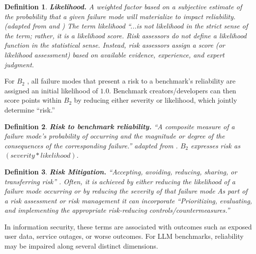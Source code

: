 \documentclass{article}
\newtheorem{dfn}{Definition}[section]
\newcommand\bb{$B_2$ }
\begin{document}
\begin{dfn}
{\bf Likelihood.} A weighted factor based on a subjective estimate of the probability that a given failure mode will materialize to impact reliability. (adapted from \cite{cnssi4009} and \cite{Rausand2004}) The term likelihood ``...is not likelihood in the strict sense of the term; rather, it is a likelihood score. Risk assessors do not define a likelihood function in the statistical sense. Instead, risk assessors assign a score (or likelihood assessment) based on available evidence, experience, and expert judgment. 
\end{dfn}

For \bb, all failure modes that present a risk to a benchmark's reliability are assigned an initial likelihood of $1.0$. Benchmark creators/developers can then score points within \bb by reducing either severity or likelihood, which jointly determine ``risk.''

\begin{dfn}
{\bf Risk to benchmark reliability.} ``A composite measure of a failure mode’s probability of occurring and the magnitude or degree of the consequences of the corresponding failure.'' adapted from \cite{nist2024ai}. \bb expresses risk as $(severity*likelihood)$.
\end{dfn}

\begin{dfn}
{\bf Risk Mitigation.} ``Accepting, avoiding, reducing, sharing, or transferring risk'' \cite{raji2021ai}. Often, it is achieved by either reducing the likelihood of a failure mode occurring or by reducing the severity of that failure mode \cite{rausand2020risk} As part of a risk assessment or risk management it can incorporate ``Prioritizing, evaluating, and implementing the appropriate risk-reducing controls/countermeasures.'' \cite{cnssi4009}
\end{dfn}

In information security, these terms are associated with outcomes such as exposed user data, service outages, or worse outcomes. For LLM benchmarks, reliability may be impaired along several distinct dimensions.
\end{document}
